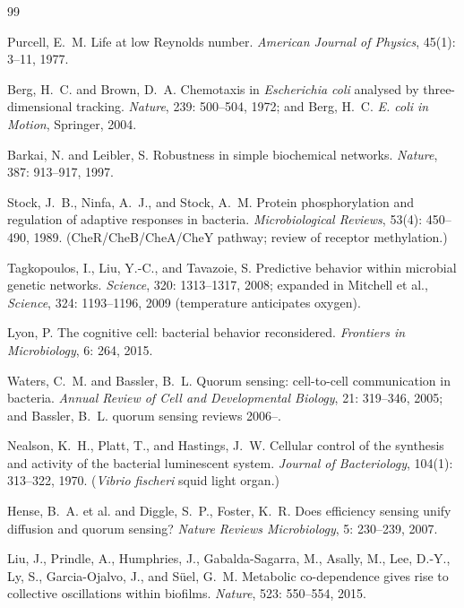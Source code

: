 \documentclass[11pt,a4paper]{article}
\begin{document}
\begin{thebibliography}{99}

Purcell, E.~M.
Life at low Reynolds number.
\textit{American Journal of Physics}, 45(1): 3--11, 1977.

Berg, H.~C. and Brown, D.~A.
Chemotaxis in \textit{Escherichia coli} analysed by three-dimensional tracking.
\textit{Nature}, 239: 500--504, 1972; and Berg, H.~C. \textit{E. coli in Motion}, Springer, 2004.

Barkai, N. and Leibler, S.
Robustness in simple biochemical networks.
\textit{Nature}, 387: 913--917, 1997.

Stock, J.~B., Ninfa, A.~J., and Stock, A.~M.
Protein phosphorylation and regulation of adaptive responses in bacteria.
\textit{Microbiological Reviews}, 53(4): 450--490, 1989.
(CheR/CheB/CheA/CheY pathway; review of receptor methylation.)

Tagkopoulos, I., Liu, Y.-C., and Tavazoie, S.
Predictive behavior within microbial genetic networks.
\textit{Science}, 320: 1313--1317, 2008; expanded in Mitchell et al., \textit{Science}, 324: 1193--1196, 2009 (temperature anticipates oxygen).

Lyon, P.
The cognitive cell: bacterial behavior reconsidered.
\textit{Frontiers in Microbiology}, 6: 264, 2015.

Waters, C.~M. and Bassler, B.~L.
Quorum sensing: cell-to-cell communication in bacteria.
\textit{Annual Review of Cell and Developmental Biology}, 21: 319--346, 2005; and Bassler, B.~L. quorum sensing reviews 2006--.

Nealson, K.~H., Platt, T., and Hastings, J.~W.
Cellular control of the synthesis and activity of the bacterial luminescent system.
\textit{Journal of Bacteriology}, 104(1): 313--322, 1970. (\textit{Vibrio fischeri} squid light organ.)

Hense, B.~A. et al. and Diggle, S.~P., Foster, K.~R.
Does efficiency sensing unify diffusion and quorum sensing?
\textit{Nature Reviews Microbiology}, 5: 230--239, 2007.

Liu, J., Prindle, A., Humphries, J., Gabalda-Sagarra, M., Asally, M., Lee, D.-Y., Ly, S., Garcia-Ojalvo, J., and S\"{u}el, G.~M.
Metabolic co-dependence gives rise to collective oscillations within biofilms.
\textit{Nature}, 523: 550--554, 2015.


\end{thebibliography}
\end{document}
